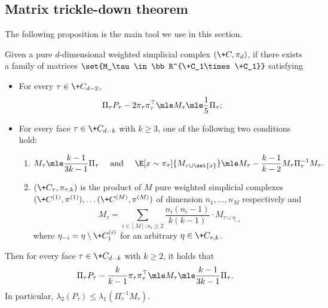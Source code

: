 \documentclass[a4paper,11pt]{article}
\begin{document}
\subsection{Matrix trickle-down theorem}
The following proposition is the main tool we use in this section.
\begin{proposition}
	\label{thm:mtd-inductive}
	Given a pure $d$-dimensional weighted simplicial complex $(\+C,\pi_d)$, if there exists a family of matrices $\set{M_\tau\in\bb R^{\+C_1\times \+C_1}}$ satisfying
	\begin{itemize}
		\item For every $\tau\in\+C_{d-2}$, 
		\[
			\Pi_\tau P_\tau -2 \pi_\tau \pi_\tau^\top \mle M_\tau \mle \frac{1}{5}\Pi_\tau;
		\]
		\item For every face $\tau\in \+C_{d-k}$ with $k\geq 3$, one of the following two conditions hold:
		\begin{enumerate}
			\item 
			\[
				M_\tau \mle \frac{k-1}{3k-1}\Pi_\tau\quad\mbox{ and }\quad\E[x\sim\pi_\tau]{M_{\tau\cup\set{x}}}\mle M_\tau -\frac{k-1}{k-2}M_\tau\Pi^{-1}_\tau M_\tau .
			\]
			\item $(\+C_\tau,\pi_{\tau,k})$ is the product of $M$ pure weighted simplicial complexes $(\+C^{(1)},\pi^{(1)}), \dots (\+C^{(M)},\pi^{(M)})$ of dimension $n_1,\dots,n_M$ respectively and
			\[
				M_\tau = \sum_{i\in [M]\colon n_i\ge 2} \frac{n_i(n_i-1)}{k(k-1)}\cdot M_{\tau\cup \eta_{-i}}
			\]
			where $\eta_{-i} = \eta\setminus \+C^{(i)}_1$ for an arbitrary $\eta\in \+C_{\tau,k}$.
			\end{enumerate}
	\end{itemize}
	Then for every face $\tau\in\+C_{d-k}$ with $k\geq 2$, it holds that
	\[
		\Pi_\tau P_\tau -\frac{k}{k-1}\pi_\tau \pi_\tau^\top \mle M_\tau \mle \frac{k-1}{3k-1}\Pi_\tau.
	\]
	In particular, $\lambda_2(P_\tau)\le \lambda_1(\Pi_\tau^{-1}M_\tau)$.
\end{proposition}
\end{document}
